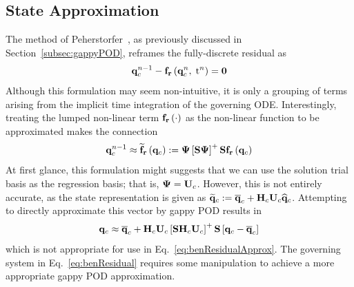\subsection{State Approximation}
%
The method of Peherstorfer~\cite{Peherstorfer2020Adaptive}, as previously discussed in Section~\ref{subsec:gappyPOD}, reframes the fully-discrete residual as
%
\begin{equation}\label{eq:benResidualTwo}
	\mathbf{q}_{c}^{n-1} - \mathbf{f}_{\mathbf{r}}\left(\mathbf{q}_{c}^{n},\; \text{t}^{n}\right) = \mathbf{0}
\end{equation}
%
Although this formulation may seem non-intuitive, it is only a grouping of terms arising from the implicit time integration of the governing ODE. Interestingly, treating the lumped non-linear term $\mathbf{f}_{\mathbf{r}}\left(\cdot\right)$ as the non-linear function to be approximated makes the connection
%
\begin{equation}\label{eq:benResidualApprox}
	\consVec^{\timeIdx-1} \approx \rhsResApproxFunc{\consVec} \defEq \deimBasis \left[\sampMat \deimBasis \right]^+ \sampMat \rhsResFunc{\consVec}
\end{equation}
%
At first glance, this formulation might suggests that we can use the solution trial basis as the regression basis; that is, $\deimBasis = \consTrial$. However, this is not entirely accurate, as the state representation is given as $\consVecRom \defEq \consVecCent + \consScale \consTrial \consVecCoef$. Attempting to directly approximate this vector by gappy POD results in
%
\begin{equation}\label{eq:stateGPODWrong}
	\consVec \approx \consVecCent + \consScale \consTrial \left[\sampMat \consScale \consTrial\right]^+ \sampMat \left[\consVec - \consVecCent\right]
\end{equation}
%
which is not appropriate for use in Eq.~\ref{eq:benResidualApprox}. The governing system in Eq.~\ref{eq:benResidual} requires some manipulation to achieve a more appropriate gappy POD approximation.

